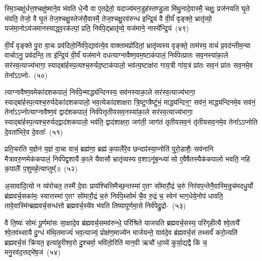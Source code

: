 स्मि॒ञ्चक्षु॑र्धत्त॒श्चक्षु॑ष्माने॒व भ॑वति धे॒न्वै वा ए॒तद्रेतो॒ यदाज्य॑मन॒डुह॑स्तण्डु॒ला मि॑थु॒नादे॒वास्मै॒ चक्षुः॒ प्रज॑नयति घृ॒ते भ॑वति॒ तेजो॒ वै घृ॒तं तेज॒श्चक्षु॒स्तेज॑सै॒वास्मै॒ तेज॒श्चक्षु॒रव॑रुन्ध इन्द्रि॒यं वै वी॒र्यं॑ वृङ्क्ते॒ भ्रातृ॑व्यो॒ यज॑मा॒नो\-ऽय॑जमानस्याद्ध्व॒रक॑ल्पां॒ प्रति॒ निर्व॑पे॒द्भ्रातृ॑व्ये॒ यज॑माने॒ नास्ये᳚न्द्रि॒यं~(४९)

वी॒र्यं॑ वृङ्क्ते पु॒रा वा॒चः प्रव॑दितो॒र्निर्व॑पे॒द्याव॑त्ये॒व वाक्तामप्रो॑दितां॒ भ्रातृ॑व्यस्य वृङ्क्ते॒ ताम॑स्य॒ वाचं॑ प्र॒वद॑न्तीम॒न्या वाचो\-ऽनु॒ प्रव॑दन्ति॒ ता इ॑न्द्रि॒यं वी॒र्यं॑ यज॑माने दधत्याग्ना\-वैष्ण॒व\-म॒ष्टा\-क॑पालं॒ निर्व॑पेत्प्रातः सव॒नस्या॑का॒ले सर॑स्व॒त्याज्य॑भागा॒ स्याद्बा॑र्\mbox{}हस्प॒त्यश्च॒रुर्यद॒ष्टाक॑पालो॒ भव॑त्य॒ष्टाक्ष॑रा गाय॒त्री गा॑य॒त्रं प्रा॑तः सव॒नं प्रा॑तः सव॒नमे॒व तेना᳚\-ऽऽ\-प्नो-~(५०)

त्याग्नावैष्ण॒वमेका॑\-दश\-कपालं॒ निर्व॑पे॒न्माद्ध्य॑न्दिनस्य॒ सव॑नस्या\-का॒ले सर॑स्व॒त्याज्य॑भागा॒ स्याद्बा॑र्\mbox{}हस्प॒त्यश्च॒रुर्यदेका॑\-दश\-कपालो॒ भव॒त्येका॑\-दशाक्षरा त्रि॒ष्टुप्त्रैष्टु॑भं॒ माद्ध्य॑न्दिन॒ꣳ॒ सव॑नं॒ माद्ध्य॑न्दिनमे॒व सव॑नं॒ तेना᳚\-ऽऽ\-प्नोत्याग्नावैष्ण॒वं द्वाद॑श\-कपालं॒ निर्व॑पेत्तृतीय\-सव॒नस्या॑\-का॒ले सर॑स्व॒त्याज्य॑भागा॒ स्याद्बा॑र्\mbox{}ह\-स्प॒त्यश्च॒रुर्यद्द्वाद॑श\-कपालो॒ भव॑ति॒ द्वाद॑शाक्षरा॒ जग॑ती॒ जाग॑तं तृतीयसव॒नं तृ॑तीयसव॒नमे॒व तेना᳚\-ऽऽ\-प्नोति दे॒वता॑भिरे॒व दे॒वताः᳚~(५१)

प्रति॒चर॑ति य॒ज्ञेन॑ य॒ज्ञं वा॒चा वाचं॒ ब्रह्म॑णा॒ ब्रह्म॑ क॒पालै॑रे॒व छन्दाꣴ॑स्या॒प्नोति॑ पुरो॒डाशैः॒ सव॑नानि मैत्रावरु॒णमेक॑कपालं॒ निर्व॑पेद्व॒शायै॑ का॒ले यैवासौ भ्रातृ॑व्यस्य व॒शा\-ऽनू॑ब॒न्ध्या॑ सो ए॒वैषैतस्यैक॑कपालो भवति॒ नहि क॒पालैः᳚ प॒शुमर्\mbox{}ह॒त्याप्तुम्᳚॥~(५२)

{\anuvakamend[{ब्रह्म॑णै॒वैन॑म॒भिच॑रति य॒ज्ञो न तावे॒वास्ये᳚न्द्रि॒यमा᳚प्नोति दे॒वताः᳚ स॒प्तत्रिꣳ॑शच्च।}]}

अ॒सावा॑दि॒त्यो न व्य॑रोचत॒ तस्मै॑ दे॒वाः प्राय॑श्चित्ति\-मैच्छ॒न्तस्मा॑ ए॒तꣳ सो॑मारौ॒द्रं च॒रुं निर॑वप॒न्तेनै॒वास्मि॒न्रुच॑मद\-धु॒र्यो ब्र॑ह्मवर्च॒सका॑मः॒ स्यात्तस्मा॑ ए॒तꣳ सो॑मारौ॒द्रं च॒रुं निर्व॑पे॒थ्सोमं॑ चै॒व रु॒द्रं च॒ स्वेन॑ भाग॒धेये॒नोप॑ धावति॒ तावे॒वास्मि॑न्ब्रह्मवर्च॒सन्ध॑त्तो ब्रह्मवर्च॒स्ये॑व भ॑वति तिष्यापूर्णमा॒से निर्व॑पेद्रु॒द्रो-~(५३)

वै ति॒ष्यः॑ सोमः॑ पू॒र्णमा॑सः सा॒क्षादे॒व ब्र॑ह्मवर्च॒समव॑\-रुन्धे॒ परि॑श्रिते याजयति ब्रह्मवर्च॒सस्य॒ परि॑गृहीत्यै श्वे॒तायै᳚ श्वे॒तव॑थ्सायै दु॒ग्धं म॑थि॒तमाज्यं॑ भव॒त्याज्यं॒ प्रोक्ष॑ण॒माज्ये॑न मार्जयन्ते॒ याव॑दे॒व ब्र॑ह्मवर्च॒सं तथ्सर्वं॑ करो॒त्यति॑ ब्रह्मवर्च॒सं क्रि॑यत॒ इत्या॑हुरीश्व॒रो दु॒श्चर्मा॒ भवि॑तो॒रिति॑ मान॒वी ऋचौ॑ धा॒य्ये॑ कुर्या॒द्यद्वै किं च॒ मनु॒रव॑द॒त्तद्भे॑ष॒जं~(५४)

